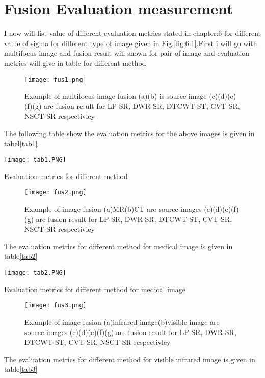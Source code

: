 \section{Fusion Evaluation measurement}
I now will list value of different evaluation metrics stated in chapter:6 for different value of sigma for different type of image given in Fig.\ref{fig:6.1}.First i will go with multifocus image and fusion result will shown for pair of image and evaluation metrics will give in table for different method \hfill\break

\begin{figure}[h!]
  \centering
  \texttt{[image: fus1.png]}
  \caption{Example of multifocus image fusion (a)(b) is source image (c)(d)(e)(f)(g) are fusion result for LP-SR, DWR-SR, DTCWT-ST, CVT-SR, NSCT-SR respectivley }\label{fus1}
\end{figure} 
The following table show the evaluation metrics for the above images is given in tabel\ref{tab1}

\begin{table}[!htb] 
 \centering
  \texttt{[image: tab1.PNG]}
  \caption{Evaluation metrics for different method}
  \label{tab1}
\end{table}

\begin{figure}[h!]
  \centering
  \texttt{[image: fus2.png]}
  \caption{Example of  image fusion (a)MR(b)CT are source images (c)(d)(e)(f)(g) are fusion result for LP-SR, DWR-SR, DTCWT-ST, CVT-SR, NSCT-SR respectivley }\label{fus2}
\end{figure}

The evaluation metrics for different method for medical image is given in table\ref{tab2}

\begin{table}[!htb] 
 \centering
  \texttt{[image: tab2.PNG]}
  \caption{Evaluation metrics for different method for medical image}
  \label{tab2}
\end{table}

\begin{figure}[h!]
  \centering
  \texttt{[image: fus3.png]}
  \caption{Example of  image fusion (a)infrared image(b)visible image are source images (c)(d)(e)(f)(g) are fusion result for LP-SR, DWR-SR, DTCWT-ST, CVT-SR, NSCT-SR respectivley }\label{fus3}
\end{figure}

The evaluation metrics for different method for visible infrared image is given in table\ref{tab3}

